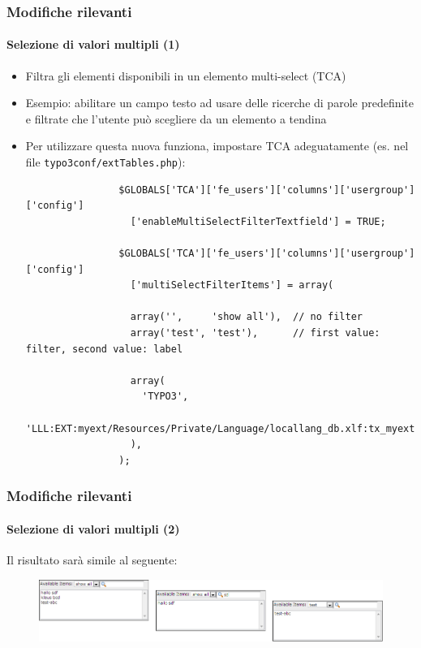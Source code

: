 \begin{frame}[fragile]
	\frametitle{Modifiche rilevanti}
	\framesubtitle{Selezione di valori multipli (1)}

	\lstset{
		basicstyle=\tiny\ttfamily
	}

	\begin{itemize}
		\item Filtra gli elementi disponibili in un elemento multi-select (TCA)
		\item Esempio: abilitare un campo testo ad usare delle ricerche di parole predefinite e filtrate che l'utente può scegliere da un elemento a tendina

		\item Per utilizzare questa nuova funziona, impostare TCA adeguatamente\newline
			(es. nel file \texttt{typo3conf/extTables.php}):


			\begin{lstlisting}
				$GLOBALS['TCA']['fe_users']['columns']['usergroup']['config']
				  ['enableMultiSelectFilterTextfield'] = TRUE;

				$GLOBALS['TCA']['fe_users']['columns']['usergroup']['config']
				  ['multiSelectFilterItems'] = array(

				  array('',     'show all'),  // no filter
				  array('test', 'test'),      // first value: filter, second value: label

				  array(
				    'TYPO3',
				    'LLL:EXT:myext/Resources/Private/Language/locallang_db.xlf:tx_myext.label.typo3'
				  ),
				);
			\end{lstlisting}

	\end{itemize}

\end{frame}


\begin{frame}[fragile]
	\frametitle{Modifiche rilevanti}
	\framesubtitle{Selezione di valori multipli (2)}

	Il risultato sarà simile al seguente:

	\begin{figure}
		\includegraphics[width=1\linewidth]{Images/InDepthChanges/MultipleValueSelector.png}
	\end{figure}

\end{frame}

